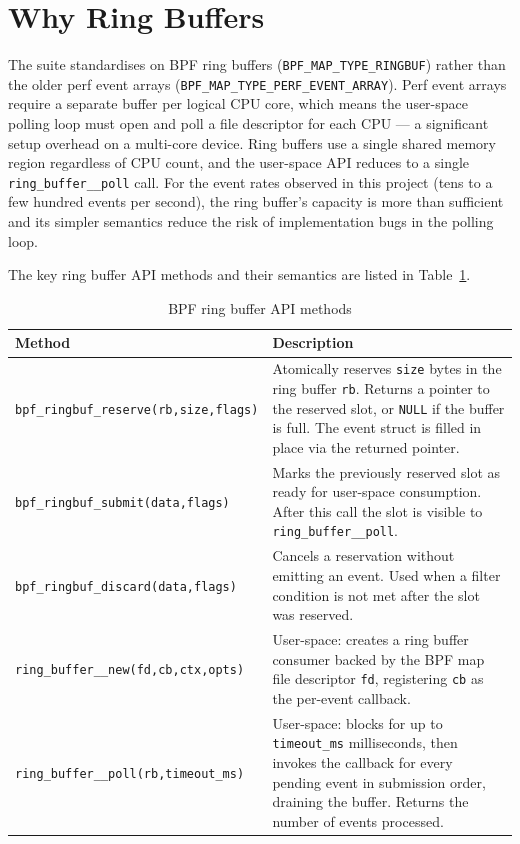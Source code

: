 \documentclass{mnitjaipur}
\begin{document}
\section{Why Ring Buffers}
The suite standardises on BPF ring buffers (\texttt{BPF\_MAP\_TYPE\_RINGBUF}) rather than the older perf event arrays (\texttt{BPF\_MAP\_TYPE\_PERF\_EVENT\_ARRAY}). Perf event arrays require a separate buffer per logical CPU core, which means the user-space polling loop must open and poll a file descriptor for each CPU — a significant setup overhead on a multi-core device. Ring buffers use a single shared memory region regardless of CPU count, and the user-space API reduces to a single \texttt{ring\_buffer\_\_poll} call. For the event rates observed in this project (tens to a few hundred events per second), the ring buffer's capacity is more than sufficient and its simpler semantics reduce the risk of implementation bugs in the polling loop.

The key ring buffer API methods and their semantics are listed in Table~\ref{tab:ringbuf-api}.

\begin{table}[H]
  \centering
  \small
  \caption{BPF ring buffer API methods}
  \label{tab:ringbuf-api}
  \begin{tabular}{|p{}|p{}|}
    \hline
    \textbf{Method} & \textbf{Description} \\ \hline
    \texttt{bpf\_ringbuf\_reserve(\allowbreak rb,\allowbreak size,\allowbreak flags)} & Atomically reserves \texttt{size} bytes in the ring buffer \texttt{rb}. Returns a pointer to the reserved slot, or \texttt{NULL} if the buffer is full. The event struct is filled in place via the returned pointer. \\ \hline
    \texttt{bpf\_ringbuf\_submit(\allowbreak data,\allowbreak flags)} & Marks the previously reserved slot as ready for user-space consumption. After this call the slot is visible to \texttt{ring\_buffer\_\_poll}. \\ \hline
    \texttt{bpf\_ringbuf\_discard(\allowbreak data,\allowbreak flags)} & Cancels a reservation without emitting an event. Used when a filter condition is not met after the slot was reserved. \\ \hline
    \texttt{ring\_buffer\_\_new(\allowbreak fd,\allowbreak cb,\allowbreak ctx,\allowbreak opts)} & User-space: creates a ring buffer consumer backed by the BPF map file descriptor \texttt{fd}, registering \texttt{cb} as the per-event callback. \\ \hline
    \texttt{ring\_buffer\_\_poll(\allowbreak rb,\allowbreak timeout\_ms)} & User-space: blocks for up to \texttt{timeout\_ms} milliseconds, then invokes the callback for every pending event in submission order, draining the buffer. Returns the number of events processed. \\ \hline
  \end{tabular}
\end{table}
\end{document}
